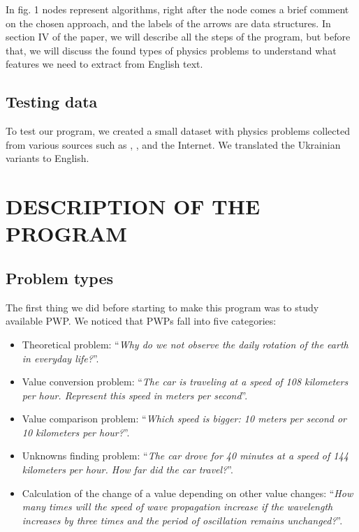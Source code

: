 \documentclass[a4paper, 12pt]{article}
\newcommand{\etext}[1]{\enquote{\textit{#1}}}
\begin{document}
	In fig. 1 nodes represent algorithms, right after the node comes a brief
	comment on the chosen approach, and the labels of the arrows are data
	structures. In section IV of the paper, we will describe all the steps
	of the program, but before that, we will discuss the found types of
	physics problems to understand what features we need to extract from
	English text.
	
	\subsection{Testing data}
	
	To test our program, we created a small dataset with physics problems
	collected from various sources such as \cite{ukr_ph_1}, \cite{ukr_ph_2}, and the
	Internet. We translated the Ukrainian variants to English.
	
	\section{DESCRIPTION OF THE PROGRAM}
	
	\subsection{Problem types}
	
	The first thing we did before starting to make this program was to study
	available PWP. We noticed that PWPs fall into five categories:
	
	\begin{itemize}
	\item
	  Theoretical problem: \etext{Why do we not observe the daily rotation
	  of the earth in everyday life?}.
	\item
	  Value conversion problem: \etext{The car is traveling at a speed of
	  108 kilometers per hour. Represent this speed in meters per second}.
	\item
	  Value comparison problem: \etext{Which speed is bigger: 10 meters per
	  second or 10 kilometers per hour?}.
	\item
	  Unknowns finding problem: \etext{The car drove for 40 minutes at a
	  speed of 144 kilometers per hour. How far did the car travel?}.
	\item
	  Calculation of the change of a value depending on other value changes:
	  \etext{How many times will the speed of wave propagation increase if
	  the wavelength increases by three times and the period of oscillation
	  remains unchanged?}.
	\end{itemize}
	
\end{document}
